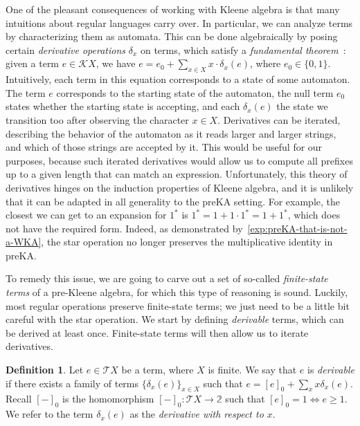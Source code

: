 \documentclass[11pt,a4paper]{amsart}
\theoremstyle{definition}
\newtheorem{definition}[theorem]{Definition}
\begin{document}
One of the pleasant consequences of working with Kleene algebra is that many
intuitions about regular languages carry over.  In particular, we can analyze
terms by characterizing them as automata.  This can be done algebraically by
posing certain \emph{derivative operations} $ \delta _x$ on terms, which satisfy
a \emph{fundamental theorem}~\cite{Silva_2010}: given a term
$e \in \mathcal{K}X$, we have $e = e_0 + \sum _{x \in X} x \cdot \delta _x(e)$,
where $e_0 \in \{0,1\}$.  Intuitively, each term in this equation corresponds to
a state of some automaton.  The term $e$ corresponds to the starting state of
the automaton, the null term $e_0$ states whether the starting state is
accepting, and each $ \delta _x(e)$ the state we transition too after observing
the character $x \in X$.  Derivatives can be iterated, describing the behavior
of the automaton as it reads larger and larger strings, and which of those
strings are accepted by it.  This would be useful for our purposes, because such
iterated derivatives would allow us to compute all prefixes up to a given length
that can match an expression.  Unfortunately, this theory of derivatives hinges
on the induction properties of Kleene algebra, and it is unlikely that it can be
adapted in all generality to the preKA setting.  For example, the closest we can
get to an expansion for $1^*$ is $1^* = 1 + 1 \cdot 1^* = 1 + 1^*$, which does
not have the required form.
Indeed, as demonstrated by~\cref{exp:preKA-that-is-not-a-WKA}, 
the star operation no longer preserves the multiplicative identity in preKA.

To remedy this issue, we are going to carve out a set of so-called
\emph{finite-state terms} of a pre-Kleene algebra, for which this type of
reasoning is sound.  Luckily, most regular operations preserve finite-state
terms; we just need to be a little bit careful with the star operation.  We
start by defining \emph{derivable} terms, which can be derived at least once.
Finite-state terms will then allow us to iterate derivatives.

\begin{definition}
  Let $e  \in  \mathcal{T}X$ be a term, where $X$ is finite.  We say that $e$ is
  \emph{derivable} if there exists a family of terms $\{ \delta _x(e)\}_{x  \in  X}$ such
  that $e = [e]_0 +  \sum _x x \delta _x(e)$.  
  Recall \([-]_0\) is the homomorphism \([-]_0: \mathcal{T}X  \to  \mathbb{2}\) such that \([e]_0 = 1  \iff  e  \geq  1\).
  We refer to the term $ \delta _x(e)$ as the
  \emph{derivative with respect to $x$}.
\end{definition}
\end{document}
